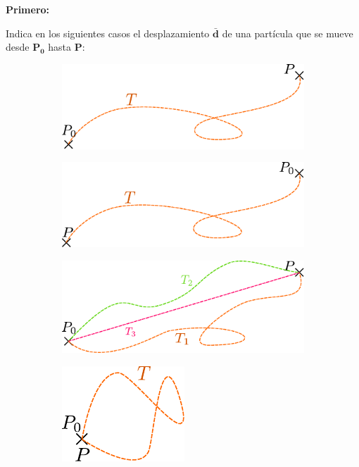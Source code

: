 \clearpage
\begin{comprension}
  {\bf Primero:}

Indica en los siguientes casos el desplazamiento {$\mathbold{\bar{d}}$} de una partícula que se mueve desde {$\mathbold{P_0}$} hasta {$\mathbold{P}$}:

\begin{figure}[H]
 \begin{subfigure}{0.5\textwidth}
    \centering
 	\includegraphics[width=.7\linewidth]{img/trayectoria_ej1.pdf}
	\caption{}	
\end{subfigure}   
 \begin{subfigure}{0.5\textwidth}
    \centering
 	\includegraphics[width=.7\linewidth]{img/trayectoria_ej2.pdf}
	\caption{}	
\end{subfigure} 
 \begin{subfigure}{0.5\textwidth}
    \centering
 	\includegraphics[width=.7\linewidth]{img/trayectoria_ej3.pdf}
	\caption{}	
\end{subfigure} 
 \begin{subfigure}{0.5\textwidth}
    \centering
 	\includegraphics[width=.35\linewidth]{img/trayectoria_ej4.pdf}
	\caption{}	
\end{subfigure}
\end{figure}


\end{comprension}
